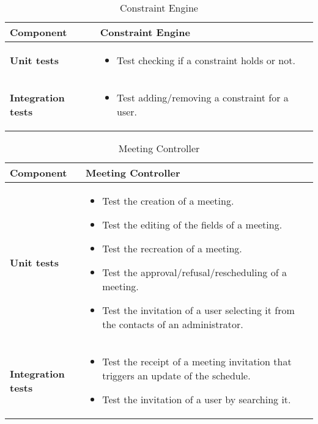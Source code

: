\begin{table}[h]	
	\centering
	\def\arraystretch{1.5}
	\begin{tabular}{|m{4cm}|m{12cm}|}
		\hline
		\textbf{Component} & Constraint Engine \\ \hline
		\textbf{Unit tests} & 
			\begin{itemize}
			\item Test checking if a constraint holds or not.
			\end{itemize} \\ \hline
		\textbf{Integration tests} & 
			\begin{itemize}
			\item Test adding/removing a constraint for a user.
			\end{itemize} \\ \hline
	\end{tabular}
	\caption{Constraint Engine}
\end{table}

\begin{table}[h]	
	\centering
	\def\arraystretch{1.5}
	\begin{tabular}{|m{4cm}|m{12cm}|}
		\hline
		\textbf{Component} & Meeting Controller \\ \hline
		\textbf{Unit tests} & 
			\begin{itemize}
			\item Test the creation of a meeting.
			\item Test the editing of the fields of a meeting.
			\item Test the recreation of a meeting.
			\item Test the approval/refusal/rescheduling of a meeting.
			\item Test the invitation of a user selecting it from the contacts of an administrator.
			\end{itemize} \\ \hline
		\textbf{Integration tests} & 
			\begin{itemize}
			\item Test the receipt of a meeting invitation that triggers an update of the schedule.
			\item Test the invitation of a user by searching it.
			\end{itemize} \\ \hline
	\end{tabular}
	\caption{Meeting Controller}
\end{table}

